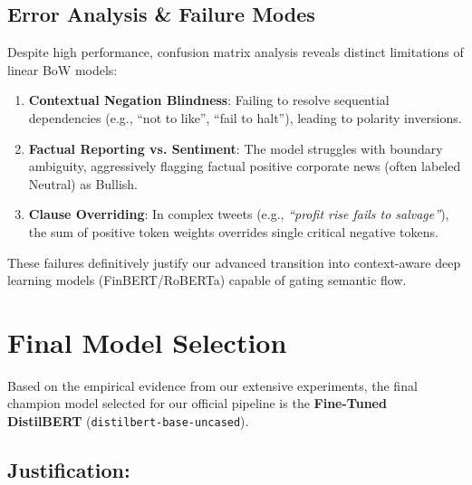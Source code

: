 \documentclass[11pt,a4paper]{article}
\begin{document}
\subsection{Error Analysis \& Failure Modes}
Despite high performance, confusion matrix analysis reveals distinct limitations of linear BoW models:
\begin{enumerate}[noitemsep]
    \item \textbf{Contextual Negation Blindness}: Failing to resolve sequential dependencies (e.g., ``not to like'', ``fail to halt''), leading to polarity inversions.
    \item \textbf{Factual Reporting vs. Sentiment}: The model struggles with boundary ambiguity, aggressively flagging factual positive corporate news (often labeled Neutral) as Bullish.
    \item \textbf{Clause Overriding}: In complex tweets (e.g., \textit{``profit rise fails to salvage''}), the sum of positive token weights overrides single critical negative tokens.
\end{enumerate}
These failures definitively justify our advanced transition into context-aware deep learning models (FinBERT/RoBERTa) capable of gating semantic flow.

\section{Final Model Selection}

Based on the empirical evidence from our extensive experiments, the final champion model selected for our official pipeline is the \textbf{Fine-Tuned DistilBERT} (\texttt{distilbert-base-uncased}).

\subsection{Justification:}
\end{document}
